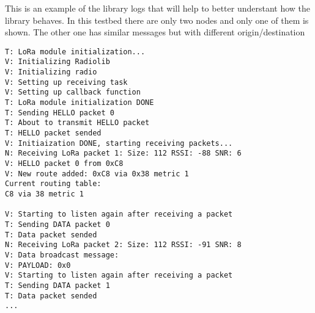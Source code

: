 This is an example of the library logs that will help to better understant how the library behaves. In this testbed there are only two nodes and only one of them is shown. The other one has similar messages but with different origin/destination

\begin{lstlisting}[numbers=none, caption={[Fragment of library logs]Fragment of the initialization logs of the library where it can be seen how the library recieves telemetry from other nodes, builds the routing table and sends some data.}, label=lst:LibraryLog,captionpos=b]
T: LoRa module initialization...
V: Initializing Radiolib
V: Initializing radio
V: Setting up receiving task
V: Setting up callback function
T: LoRa module initialization DONE
T: Sending HELLO packet 0
T: About to transmit HELLO packet
T: HELLO packet sended
V: Initiaization DONE, starting receiving packets...
N: Receiving LoRa packet 1: Size: 112 RSSI: -88 SNR: 6
V: HELLO packet 0 from 0xC8
V: New route added: 0xC8 via 0x38 metric 1
Current routing table:
C8 via 38 metric 1

V: Starting to listen again after receiving a packet
T: Sending DATA packet 0
T: Data packet sended
N: Receiving LoRa packet 2: Size: 112 RSSI: -91 SNR: 8
V: Data broadcast message:
V: PAYLOAD: 0x0
V: Starting to listen again after receiving a packet
T: Sending DATA packet 1
T: Data packet sended
...
\end{lstlisting}



